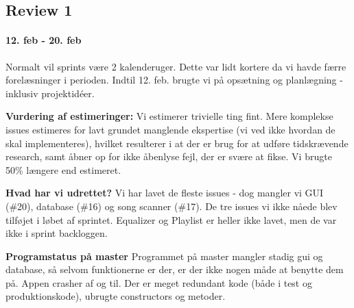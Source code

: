 \subsection*{Review 1}
\paragraph{12. feb - 20. feb}

Normalt vil sprints være 2 kalenderuger. Dette var lidt kortere da vi havde færre forelæsninger i perioden. Indtil 12. feb. brugte vi på opsætning og planlægning - inklusiv projektidéer.


\textbf{Vurdering af estimeringer:}
Vi estimerer trivielle ting fint.
Mere komplekse issues estimeres for lavt grundet manglende ekspertise (vi ved ikke hvordan de skal implementeres), hvilket resulterer i at der er brug for at udføre tidskrævende research, samt åbner op for ikke åbenlyse fejl, der er svære at fikse.
Vi brugte 50\% længere end estimeret.

\textbf{Hvad har vi udrettet?}
Vi har lavet de fleste issues - dog mangler vi GUI (\#20), database (\#16) og song scanner (\#17).
De tre issues vi ikke nåede blev tilføjet i løbet af sprintet.
Equalizer og Playlist er heller ikke lavet, men de var ikke i sprint backloggen.


\textbf{Programstatus på master}
Programmet på master mangler stadig gui og database, så selvom funktionerne er der, er der ikke nogen måde at benytte dem på.
Appen crasher af og til.
Der er meget redundant kode (både i test og produktionskode), ubrugte constructors og metoder. 

